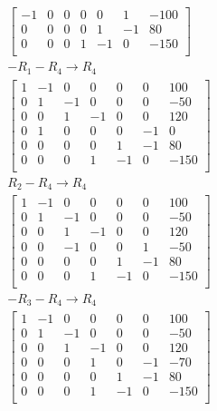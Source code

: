 \documentclass[12pt letter openany]{report}
\begin{document}
\begin{align*}
\begin{bmatrix}
    -1 & 0  & 0  & 0  & 0  & 1  & -100 \\
    0  & 0  & 0  & 0  & 1  & -1 & 80   \\
    0  & 0  & 0  & 1  & -1 & 0  & -150 \\
  \end{bmatrix}
  \\
  -R_1 - R_4  \rightarrow R_4        \\
  \begin{bmatrix}
    1 & -1 & 0  & 0  & 0  & 0  & 100  \\
    0 & 1  & -1 & 0  & 0  & 0  & -50  \\
    0 & 0  & 1  & -1 & 0  & 0  & 120  \\
    0 & 1  & 0  & 0  & 0  & -1 & 0    \\
    0 & 0  & 0  & 0  & 1  & -1 & 80   \\
    0 & 0  & 0  & 1  & -1 & 0  & -150 \\
  \end{bmatrix}
  \\
  R_2 - R_4  \rightarrow R_4         \\
  \begin{bmatrix}
    1 & -1 & 0  & 0  & 0  & 0  & 100  \\
    0 & 1  & -1 & 0  & 0  & 0  & -50  \\
    0 & 0  & 1  & -1 & 0  & 0  & 120  \\
    0 & 0  & -1 & 0  & 0  & 1  & -50  \\
    0 & 0  & 0  & 0  & 1  & -1 & 80   \\
    0 & 0  & 0  & 1  & -1 & 0  & -150 \\
  \end{bmatrix}
  \\
  -R_3 - R_4  \rightarrow R_4        \\
  \begin{bmatrix}
    1 & -1 & 0  & 0  & 0  & 0  & 100  \\
    0 & 1  & -1 & 0  & 0  & 0  & -50  \\
    0 & 0  & 1  & -1 & 0  & 0  & 120  \\
    0 & 0  & 0  & 1  & 0  & -1 & -70  \\
    0 & 0  & 0  & 0  & 1  & -1 & 80   \\
    0 & 0  & 0  & 1  & -1 & 0  & -150 \\
  \end{bmatrix}
  \\
  \\
\end{align*}
\end{document}
